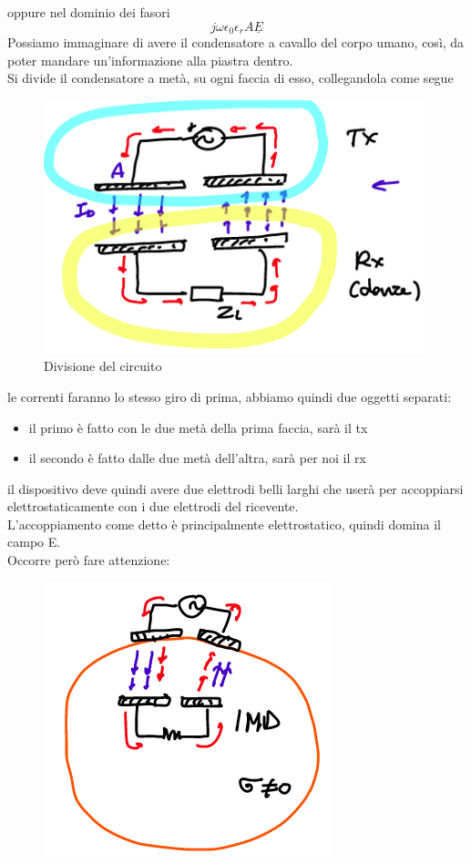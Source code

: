 \documentclass[oneside, 12pt]{extbook}
\begin{document}
oppure nel dominio dei fasori
\begin{equation}
	j\omega \epsilon_0\epsilon_rA\underline{E}
\end{equation}
Possiamo immaginare di avere il condensatore a cavallo del corpo umano, così, da poter mandare un'informazione alla piastra dentro.\\Si divide il condensatore a metà, su ogni faccia di esso, collegandola come segue
\begin{figure}[!h]
	\includegraphics[scale=0.5]{immagini/divisione_circ.png}
	\caption{Divisione del circuito}
\end{figure}
le correnti faranno lo stesso giro di prima, abbiamo quindi due oggetti separati:
\begin{itemize}
	\item il primo è fatto con le due metà della prima faccia, sarà il tx
	\item il secondo è fatto dalle due metà dell'altra, sarà per noi il rx
\end{itemize}
il dispositivo deve quindi avere due elettrodi belli larghi che userà per accoppiarsi elettrostaticamente con i due elettrodi del ricevente.\\L'accoppiamento come detto è principalmente elettrostatico, quindi domina il campo E.\\Occorre però fare attenzione:
\begin{figure}[!h]
	\includegraphics[scale=0.6]{immagini/circ_divis_corpo.png}
	\caption{}
\end{figure}
\end{document}
